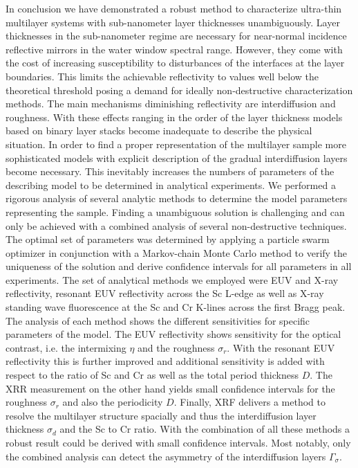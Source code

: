 \documentclass{iucr}              %
\begin{document}
In conclusion we have demonstrated a robust method to characterize ultra-thin multilayer systems with sub-nanometer layer thicknesses unambiguously. Layer thicknesses in the sub-nanometer regime are necessary for near-normal incidence reflective mirrors in the water window spectral range. However, they come with the cost of increasing susceptibility to disturbances of the interfaces at the layer boundaries. This limits the achievable reflectivity to values well below the theoretical threshold posing a demand for ideally non-destructive characterization methods. The main mechanisms diminishing reflectivity are interdiffusion and roughness. With these effects ranging in the order of the layer thickness models based on binary layer stacks become inadequate to describe the physical situation. In order to find a proper representation of the multilayer sample more sophisticated models with explicit description of the gradual interdiffusion layers become necessary. This inevitably increases the numbers of parameters of the describing model to be determined in analytical experiments. We performed a rigorous analysis of several analytic methods to determine the model parameters representing the sample. Finding a unambiguous solution is challenging and can only be achieved with a combined analysis of several non-destructive techniques. The optimal set of parameters was determined by applying a particle swarm optimizer in conjunction with a Markov-chain Monte Carlo method to verify the uniqueness of the solution and derive confidence intervals for all parameters in all experiments. The set of analytical methods we employed were EUV and X-ray reflectivity, resonant EUV reflectivity across the Sc L-edge as well as X-ray standing wave fluorescence at the Sc and Cr K-lines across the first Bragg peak. The analysis of each method shows the different sensitivities for specific parameters of the model. The EUV reflectivity shows sensitivity for the optical contrast, i.e. the intermixing $\eta$ and the roughness $\sigma_r$. With the resonant EUV reflectivity this is further improved and additional sensitivity is added with respect to the ratio of Sc and Cr as well as the total period thickness $D$. The XRR measurement on the other hand yields small confidence intervals for the roughness $\sigma_r$ and also the periodicity $D$. Finally, XRF delivers a method to resolve the multilayer structure spacially and thus the interdiffusion layer thickness $\sigma_d$ and the Sc to Cr ratio. With the combination of all these methods a robust result could be derived with small confidence intervals. Most notably, only the combined analysis can detect the asymmetry of the interdiffusion layers $\Gamma_\sigma$.
\end{document}
